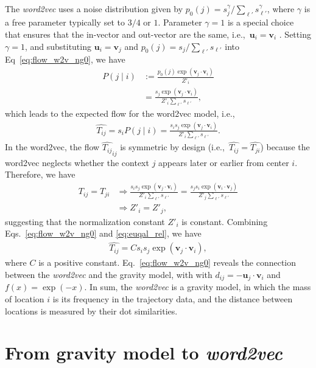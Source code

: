 \documentclass[12pt]{article} %
\def\given{\mid}
\def\ie{i.e.,~}
\begin{document}
The \textit{word2vec} uses a noise distribution given by $p_{0}(j) = s^{\gamma} _j / \sum_{\ell'} s^{\gamma}_{\ell'}$, where $\gamma$ is a free parameter typically set to $3/4$ or $1$.
Parameter $\gamma=1$ is a special choice that ensures that the in-vector and out-vector are the same, \ie $\bm{u}_i = \bm{v}_i$ \autocite{levy2014neural}.
Setting $\gamma = 1$, and substituting $\bm{u}_i = \bm{v}_j$ and $p_0(j) = s_j / \sum_{\ell'} s_{\ell'}$ into Eq~\eqref{eq:flow_w2v_ng0}, we have
\begin{align}
    P\left(j \given i \right) & := \frac{ p_0 (j) \exp(\bm{v}_j \cdot \bm{v}_{i})}{ Z'_i}                      \\
                              & =  \frac{s _j  \exp(\bm{v}_j \cdot \bm{v}_{i})}{ Z' _i\sum_{\ell'} s_{\ell'}},
\end{align}
which leads to the expected flow for the word2vec model, \ie
\begin{align}
    \hat{T_{ij}}=s_i P(j\given i) =  \frac{s_i s _j  \exp(\bm{v}_j \cdot \bm{v}_{i})}{  Z'_i\sum_{\ell'} s_{\ell'}}. \label{eq:flow_w2v_ng0}
\end{align}
In the word2vec, the flow $\hat{T_{ij}}_{ij}$ is symmetric by design (\ie $\hat{T_{ij}}=\hat{T_{ji}}$) because the word2vec neglects whether the context $j$ appears later or earlier from center $i$.
Therefore, we have
\begin{align}
    T_{ij} = T_{ji}
     & \Rightarrow
    \frac{s_i s _j  \exp(\bm{v}_j \cdot \bm{v}_{i})}{  Z'_i\sum_{\ell'} s_{\ell'}} =  \frac{s_j s _i  \exp(\bm{v}_i \cdot \bm{v}_{j})}{  Z'_j\sum_{\ell'} s_{\ell'}} \\
     & \Rightarrow
    Z'_i = Z'_j, \label{eq:euqal_rel}
\end{align}
suggesting that the normalization constant $Z' _i$ is constant.
Combining Eqs.~\eqref{eq:flow_w2v_ng0} and \eqref{eq:euqal_rel}, we have
\begin{align}
    \hat{T_{ij}}=  C s_i s _j  \exp(\bm{v}_j \cdot \bm{v}_{i}),
\end{align}
where $C$ is a positive constant.
Eq.~\eqref{eq:flow_w2v_ng0} reveals the connection between the \textit{word2vec} and the gravity model, with with $d_{ij} = - \bm{u}_{j} \cdot \bm{v}_{i}$ and $f(x) = \exp(-x)$.
In sum, the \textit{word2vec} is a gravity model, in which the mass of location $i$ is its frequency in the trajectory data, and the distance between locations is measured by their dot similarities.

\section{From gravity model to \textit{word2vec}}
\label{sec:from_gravity_to_word2vec}
\end{document}
